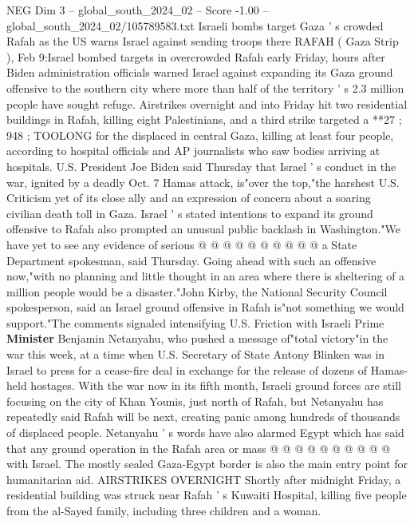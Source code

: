 \begin{textsample}{NEG Dim 3 – global\_south\_2024\_02 – Score -1.00 – global\_south\_2024\_02/105789583.txt}  \label{ex:f3_neg_090}
Israeli bombs target Gaza ' s crowded Rafah as the US warns Israel against sending troops there RAFAH ( Gaza Strip ), Feb 9:Israel bombed targets in overcrowded Rafah early Friday, hours after Biden administration officials warned Israel against expanding its Gaza ground offensive to the southern city where more than half of the territory ' s 2.3 million people have sought refuge.
Airstrikes overnight and into Friday hit two residential buildings in Rafah, killing eight Palestinians, and a third strike targeted a **27 ; 948 ; TOOLONG for the displaced in central Gaza, killing at least four people, according to hospital officials and AP journalists who saw bodies arriving at hospitals.
U.S.
President Joe Biden said Thursday that Israel ' s conduct in the war, ignited by a deadly Oct. 7 Hamas attack, is"over the top,"the harshest U.S.
Criticism yet of its close ally and an expression of concern about a soaring civilian death toll in Gaza.
Israel ' s stated intentions to expand its ground offensive to Rafah also prompted an unusual public backlash in Washington."We have yet to see any evidence of serious @ @ @ @ @ @ @ @ @ @ a State Department spokesman, said Thursday.
Going ahead with such an offensive now,"with no planning and little thought in an area where there is sheltering of a million people would be a disaster."John Kirby, the National Security Council spokesperson, said an Israel ground offensive in Rafah is"not something we would support."The comments signaled intensifying U.S.
Friction with Israeli Prime \textbf{Minister} Benjamin Netanyahu, who pushed a message of"total victory"in the war this week, at a time when U.S.
Secretary of State Antony Blinken was in Israel to press for a cease-fire deal in exchange for the release of dozens of Hamas-held hostages.
With the war now in its fifth month, Israeli ground forces are still focusing on the city of Khan Younis, just north of Rafah, but Netanyahu has repeatedly said Rafah will be next, creating panic among hundreds of thousands of displaced people.
Netanyahu ' s words have also alarmed Egypt which has said that any ground operation in the Rafah area or mass @ @ @ @ @ @ @ @ @ @ with Israel.
The mostly sealed Gaza-Egypt border is also the main entry point for humanitarian aid.
AIRSTRIKES OVERNIGHT Shortly after midnight Friday, a residential building was struck near Rafah ' s Kuwaiti Hospital, killing five people from the al-Sayed family, including three children and a woman.

\end{textsample}
